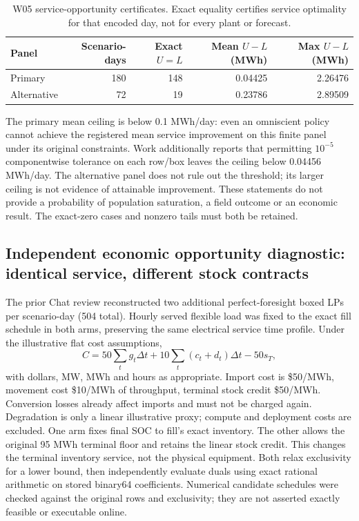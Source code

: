 \documentclass[11pt,letterpaper]{article}
\begin{document}
\begin{table}[htbp]\centering\small
\caption{W05 service-opportunity certificates. Exact equality certifies service optimality for that encoded day, not for every plant or forecast.}
\begin{tabular}{lrrrr}\toprule
Panel & Scenario-days & Exact $U=L$ & Mean $U-L$ (MWh) & Max $U-L$ (MWh)\\\midrule
Primary & 180 & 148 & 0.04425 & 2.26476\\
Alternative & 72 & 19 & 0.23786 & 2.89509\\\bottomrule
\end{tabular}
\end{table}
The primary mean ceiling is below 0.1 MWh/day: even an omniscient policy cannot achieve the registered mean service improvement on this finite panel under its original constraints. Work additionally reports that permitting $10^{-5}$ componentwise tolerance on each row/box leaves the ceiling below 0.04456 MWh/day. The alternative panel does not rule out the threshold; its larger ceiling is not evidence of attainable improvement. These statements do not provide a probability of population saturation, a field outcome or an economic result. The exact-zero cases and nonzero tails must both be retained.

\subsection{Independent economic opportunity diagnostic: identical service, different stock contracts}
\label{sec:w05econ}
The prior Chat review reconstructed two additional perfect-foresight boxed LPs per scenario-day (504 total). Hourly served flexible load was fixed to the exact fill schedule in both arms, preserving the same electrical service time profile. Under the illustrative flat cost assumptions,
\begin{equation}
 C=50\sum_t g_t\Delta t+10\sum_t(c_t+d_t)\Delta t-50s_T,
\end{equation}
with dollars, MW, MWh and hours as appropriate. Import cost is \$50/MWh, movement cost \$10/MWh of throughput, terminal stock credit \$50/MWh. Conversion losses already affect imports and must not be charged again. Degradation is only a linear illustrative proxy; compute and deployment costs are excluded. One arm fixes final SOC to fill's exact inventory. The other allows the original 95 MWh terminal floor and retains the linear stock credit. This changes the terminal inventory service, not the physical equipment. Both relax exclusivity for a lower bound, then independently evaluate duals using exact rational arithmetic on stored binary64 coefficients. Numerical candidate schedules were checked against the original rows and exclusivity; they are not asserted exactly feasible or executable online.
\end{document}
